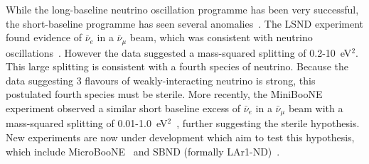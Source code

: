\newline
\newline
While the long-baseline neutrino oscillation programme has been very successful, the short-baseline programme has seen several anomalies~\cite{ShortBaseLineAnomaly}.  The LSND experiment found evidence of $\bar{\nu}_e$ in a $\bar{\nu}_\mu$ beam, which was consistent with neutrino oscillations~\cite{Aguilar:2001ty}.  However the data suggested a mass-squared splitting of 0.2-10~eV$^2$.  This large splitting is consistent with a fourth species of neutrino.  Because the data suggesting 3 flavours of weakly-interacting neutrino is strong, this postulated fourth species must be sterile.  More recently, the MiniBooNE experiment observed a similar short baseline excess of $\bar{\nu}_e$ in a $\bar{\nu}_\mu$ beam with a mass-squared splitting of 0.01-1.0~eV$^2$~\cite{Aguilar-Arevalo:2013pmq}, further suggesting the sterile hypothesis.  New experiments are now under development which aim to test this hypothesis, which include MicroBooNE~\cite{2011arXiv1110.1604I} and SBND (formally LAr1-ND)~\cite{Adams:2013uaa}.
